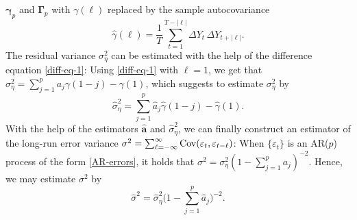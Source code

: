 $\boldsymbol{\gamma}_p$ and $\boldsymbol{\Gamma}_p$ with $\gamma(\ell)$ 
replaced by the sample autocovariance
\begin{equation}\label{est-autocov}
\widehat{\gamma}(\ell) = \frac{1}{T} \sum\limits_{t=1}^{T-|\ell|} \Delta Y_t 
\, \Delta Y_{t+|\ell|}.
\end{equation}
The residual variance $\sigma_\eta^2$ can be estimated with the help of the 
difference equation \eqref{diff-eq-1}: Using \eqref{diff-eq-1} with $\ell = 
1$, we get that $\sigma_\eta^2 = \sum_{j=1}^p a_j \gamma(1-j) - \gamma(1)$, 
which suggests to estimate $\sigma_\eta^2$ by
\begin{equation}\label{est-var-eta}
\widehat{\sigma}_\eta^2 = \sum_{j=1}^p \widehat{a}_j \widehat{\gamma}(1-j) - 
\widehat{\gamma}(1).
\end{equation}
With the help of the estimators $\widehat{\boldsymbol{a}}$
and $\widehat{\sigma}_\eta^2$, we can finally construct an estimator of the 
long-run error variance $\sigma^2 = \sum_{\ell=-\infty}^{\infty} 
\textnormal{Cov}(\varepsilon_t,\varepsilon_{t-\ell})$: When $\{ \varepsilon_t \}$ is an 
AR($p$) process of the form \eqref{AR-errors}, it holds that $\sigma^2 = 
\sigma^2_\eta ( 1-\sum_{j=1}^p a_j)^{-2}$. Hence, we may estimate $\sigma^2$ 
by
\begin{equation}\label{est-lrv}
\widehat{\sigma}^2 = \widehat{\sigma}^2_\eta \Big( 1-\sum_{j=1}^p 
\widehat{a}_j\Big)^{-2}.
\end{equation}
